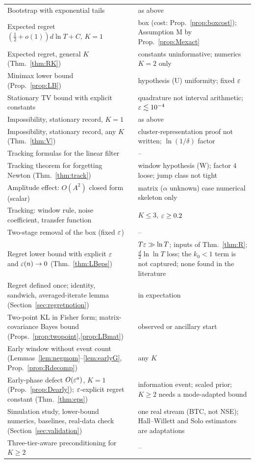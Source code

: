 \begin{center}
\begin{tabular}{@{}p{6.1cm}p{1.3cm}p{6.1cm}@{}}
Bootstrap with exponential tails & \Ps{} & as above\\
Expected regret $(\tfrac12+o(1))d\ln T+C$, $K=1$ & \Ps{} & box (cost: Prop.~\ref{prop:boxcost}); Assumption M by Prop.~\ref{prop:Mexact}\\
Expected regret, general $K$ (Thm.~\ref{thm:RK}) & \Ps{} & constants uninformative; numerics $K=2$ only\\
Minimax lower bound (Prop.~\ref{prop:LB}) & \Ps{} & hypothesis (U) uniformity; fixed $\varepsilon$\\
Stationary TV bound with explicit constants & \Ps{} & quadrature not interval arithmetic; $\varepsilon\lesssim10^{-4}$\\
Impossibility, stationary record, $K=1$ & \Ps{} & as above\\
Impossibility, stationary record, any $K$ (Thm.~\ref{thm:V}) & \Ps{} & cluster-representation proof not written; $\ln(1/\delta)$ factor\\
Tracking formulas for the linear filter & \Pt{} & --\\
Tracking theorem for forgetting Newton (Thm.~\ref{thm:track}) & \Ps{} & window hypothesis (W); factor $4$ loose; jump class not tight\\
Amplitude effect: $O(A^2)$ closed form (scalar) & \Pt{} & matrix ($\alpha$ unknown) case numerical skeleton only\\
Tracking: window rule, noise coefficient, transfer function & \Nt{} & $K\le3$, $\varepsilon\ge0.2$\\
Two-stage removal of the box (fixed $\varepsilon$) & \Ot{} & --\\
Regret lower bound with explicit $\varepsilon$ and $\varepsilon(n)\to0$ (Thm.~\ref{thm:LBeps}) & \Ps{} & $T\varepsilon\gg\ln T$; inputs of Thm.~\ref{thm:R}; $\tfrac d2\ln\ln T$ loss; the $k_0<1$ term is not captured; none found in the literature\\
Regret defined once; identity, sandwich, averaged-iterate lemma (Section~\ref{sec:regretnotion}) & \Pt{} & in expectation\\
Two-point KL in Fisher form; matrix-covariance Bayes bound (Props.~\ref{prop:twopoint},\ref{prop:LBmat}) & \Pt{} & observed or ancillary start\\
Early window without event count (Lemmas~\ref{lem:negmom}--\ref{lem:earlyG}, Prop.~\ref{prop:Rdecomp}) & \Pt{} & any $K$\\
Early-phase defect $O(\varepsilon^a)$, $K=1$ (Prop.~\ref{prop:Dearly}); $\varepsilon$-explicit regret constant (Thm.~\ref{thm:eps}) & \Ps{} & information event; scaled prior; $K\ge2$ needs a mode-adapted bound\\
Simulation study, lower-bound numerics, baselines, real-data check (Section~\ref{sec:validation}) & \Nt{} & one real stream (BTC, not NSE); Hall--Willett and Solo estimators are adaptations\\
Three-tier-aware preconditioning for $K\ge2$ & \Ot{} & --\\\bottomrule
\end{tabular}
\end{center}

